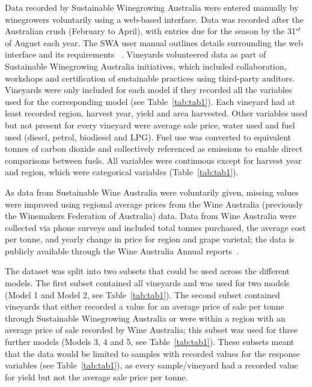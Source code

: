 \documentclass[10pt,letterpaper]{article}
\begin{document}
\par
Data recorded by Sustainable Winegrowing Australia were entered manually by winegrowers voluntarily using a web-based interface. Data was recorded after the Australian crush (February to April), with entries due for the season by the 31$^{st}$ of August each year. The SWA user manual outlines details surrounding the web interface and its requirements ~\cite{sustainablewinegrowingaustraliaSustainableWinegrowingAustralia2021}. Vineyards volunteered data as part of Sustainable Winegrowing Australia initiatives, which included collaboration, workshops and certification of sustainable practices using third-party auditors. Vineyards were only included for each model if they recorded all the variables used for the corresponding model (see Table~\ref{tab:tab1}). Each vineyard had at least recorded region, harvest year, yield and area harvested. Other variables used but not present for every vineyard were average sale price, water used and fuel used (diesel, petrol, biodiesel and LPG). Fuel use was converted to equivalent tonnes of carbon dioxide and collectively referenced as emissions to enable direct comparisons between fuels. All variables were continuous except for harvest year and region, which were categorical variables (Table~\ref{tab:tab1}).
\par
As data from Sustainable Wine Australia were voluntarily given, missing values were improved using regional average prices from the Wine Australia (previously the Winemakers Federation of Australia) data. Data from Wine Australia were collected via phone surveys and included total tonnes purchased, the average cost per tonne, and yearly change in price for region and grape varietal; the data is publicly available through the Wine Australia Annual reports~\cite{wineaustraliaNationalVintageReport2019, wineaustraliaNationalVintageReport2020, wineaustraliaNationalVintageReport2021, wineaustraliaNationalVintageReport2022, winemakersfederationofaustraliaNationalVintageReport2012, winemakersfederationofaustraliaNationalVintageReport2013, winemakersfederationofaustraliaNationalVintageReport2014, winemakersfederationofaustraliaNationalVintageReport2015, winemakersfederationofaustraliaNationalVintageReport2016, winemakersfederationofaustraliaNationalVintageReport2017, winemakersfederationofaustraliaNationalVintageReport2018}.
\par
The dataset was split into two subsets that could be used across the different models. The first subset contained all vineyards and was used for two models (Model 1 and Model 2, see Table~\ref{tab:tab1}). The second subset contained vineyards that either recorded a value for an average price of sale per tonne through Sustainable Winegrowing Australia or were within a region with an average price of sale recorded by Wine Australia; this subset was used for three further models (Models 3, 4 and 5, see Table~\ref{tab:tab1}). These subsets meant that the data would be limited to samples with recorded values for the response variables (see Table~\ref{tab:tab1}), as every sample/vineyard had a recorded value for yield but not the average sale price per tonne.
\end{document}
